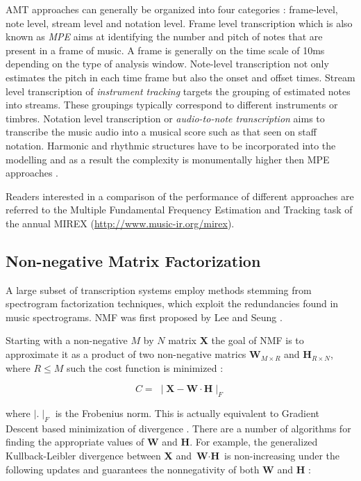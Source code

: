 \ac{AMT} approaches can generally be organized into four categories : frame-level,
note level, stream level and notation level. Frame level transcription which is
also known as \emph{\ac{MPE}} aims at identifying the number and
pitch of notes that are present in a frame of music. A frame is generally on the
time scale of 10ms depending on the type of analysis window. Note-level
transcription not only estimates the pitch in each time frame but also the onset
and offset times. Stream level transcription of \emph{instrument tracking}
targets the grouping of estimated notes into streams. These groupings typically
correspond to different instruments or timbres. Notation level transcription or
\emph{audio-to-note transcription} aims to transcribe the music audio into a
musical score such as that seen on staff notation. Harmonic and rhythmic
structures have to be incorporated into the modelling and as a result the
complexity is monumentally higher then \ac{MPE} approaches \cite{MIR-recent-dev:Schedl}.

Readers interested in a comparison of the performance of different approaches
are referred to the Multiple Fundamental Frequency Estimation and Tracking task
of the annual \ac{MIREX}
(\url{http://www.music-ir.org/mirex}).


\subsection{Non-negative Matrix Factorization}

A large subset of transcription systems employ methods stemming from spectrogram
factorization techniques, which exploit the redundancies found in music
spectrograms. \ac{NMF} was first proposed by Lee and Seung \cite{nmf1999:Seung}.

Starting with a non-negative $M$ by $N$ matrix \textbf{X} the goal of \ac{NMF} is to
approximate it as a product of two non-negative matrics $ \textbf{W}_{M \times
    R}$ and $\textbf{H}_{R \times N}$, where $R \leq M$ such the cost function is
minimized :

\begin{equation}
  C = \;\mid \textbf{X} - \textbf{W}\cdot \textbf{H} \mid _ {F}
\end{equation}

where $\mid . \mid_{F}$ is the Frobenius norm. This is actually equivalent to
Gradient Descent based minimization of divergence \cite{nmfamt2003:Smaragdis}.
There are a number of algorithms for finding the appropriate values of
\textbf{W} and \textbf{H}. For example, the generalized Kullback-Leibler
divergence between \textbf{X} and $\textbf{W}\cdot \textbf{H}$ is non-increasing
under the following updates and guarantees the nonnegativity of both \textbf{W}
and \textbf{H} :

